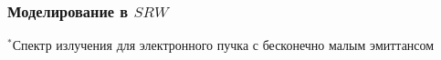 \documentclass[14pt, hyperref = {colorlinks},xcolor=table ]{beamer}
\begin{document}
\small
\begin{frame}
\frametitle{Моделирование в $SRW$}\label{t1}
\vspace{-21pt}
\begin{figure}[h]
	\begin{minipage}[h]{0.49\linewidth}
		\vspace{-10pt}
	\end{minipage}	
	\begin{minipage}[h]{0.49\linewidth}
	\end{minipage}
\end{figure}
\vspace{-40pt}
\begin{figure}[h]
\end{figure}
\vspace{10pt}
\tiny{$^*$Спектр излучения для электронного пучка с бесконечно малым эмиттансом}
\end{frame}
\end{document}
